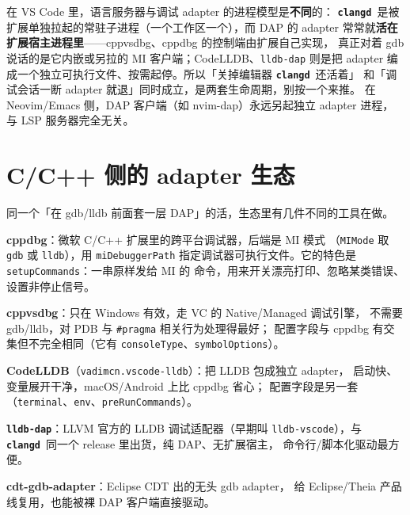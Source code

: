 \documentclass[12pt,a4paper,fontset=fandol]{ctexbook}
\newcommand{\Lib}[1]{\textbf{\texttt{#1}}}
\newcommand{\CD}{\Lib{clangd}}
\begin{document}
\begin{note}[title={DAP 与 LSP 是两个进程，还是同一个扩展宿主}]
在 VS Code 里，语言服务器与调试 adapter 的进程模型是\textbf{不同}的：
\CD\ 是被扩展单独拉起的常驻子进程（一个工作区一个），而 DAP 的 adapter
常常就\textbf{活在扩展宿主进程里}——cppvsdbg、cppdbg 的控制端由扩展自己实现，
真正对着 gdb 说话的是它内嵌或另拉的 MI 客户端；CodeLLDB、\texttt{lldb-dap}
则是把 adapter 编成一个独立可执行文件、按需起停。所以「关掉编辑器 \CD\ 还活着」
和「调试会话一断 adapter 就退」同时成立，是两套生命周期，别按一个来推。
在 Neovim/Emacs 侧，DAP 客户端（如 nvim-dap）永远另起独立 adapter 进程，
与 LSP 服务器完全无关。
\end{note}

\section{C/C++ 侧的 adapter 生态}\label{sec:ch07-s2}

同一个「在 gdb/lldb 前面套一层 DAP」的活，生态里有几件不同的工具在做。

\textbf{cppdbg}：微软 C/C++ 扩展里的跨平台调试器，后端是 MI 模式
（\texttt{MIMode} 取 \texttt{gdb} 或 \texttt{lldb}），用 \texttt{miDebuggerPath}
指定调试器可执行文件。它的特色是 \texttt{setupCommands}：一串原样发给 MI 的
命令，用来开关漂亮打印、忽略某类错误、设置非停止信号。

\textbf{cppvsdbg}：只在 Windows 有效，走 VC 的 Native/Managed 调试引擎，
不需要 gdb/lldb，对 PDB 与 \texttt{\#pragma} 相关行为处理得最好；
配置字段与 cppdbg 有交集但不完全相同（它有 \texttt{consoleType}、\texttt{symbolOptions}）。

\textbf{CodeLLDB}（\texttt{vadimcn.vscode-lldb}）：把 LLDB 包成独立 adapter，
启动快、变量展开干净，macOS/Android 上比 cppdbg 省心；
配置字段是另一套（\texttt{terminal}、\texttt{env}、\texttt{preRunCommands}）。

\textbf{\texttt{lldb-dap}}：LLVM 官方的 LLDB 调试适配器（早期叫
\texttt{lldb-vscode}），与 \CD\ 同一个 release 里出货，纯 DAP、无扩展宿主，
命令行/脚本化驱动最方便。

\textbf{cdt-gdb-adapter}：Eclipse CDT 出的无头 gdb adapter，
给 Eclipse/Theia 产品线复用，也能被裸 DAP 客户端直接驱动。
\end{document}
